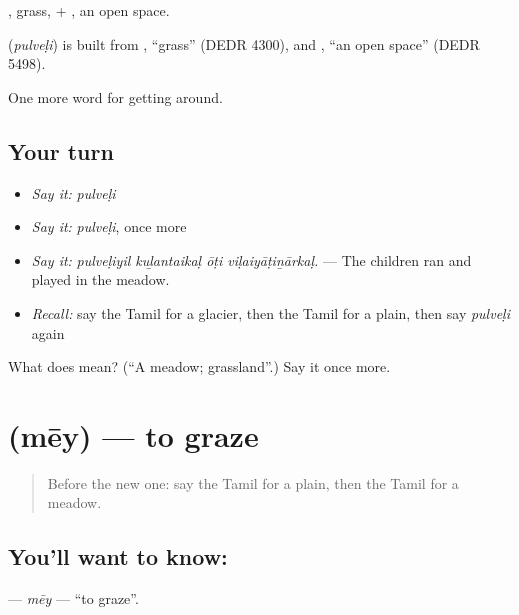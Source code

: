 , grass, + , an open space.

\begin{cousinweb}
\textbf{} (\emph{pulveḷi}) is built from , \textquotedblleft{}grass\textquotedblright{} (DEDR 4300), and , \textquotedblleft{}an open space\textquotedblright{} (DEDR 5498).
\end{cousinweb}

\begin{grammarlens}[title={What you've built}]
One more word for getting around.
\end{grammarlens}

\subsection*{Your turn}
\begin{itemize}
\raggedright
  \item \emph{Say it:} \emph{pulveḷi}
  \item \emph{Say it:} \emph{pulveḷi}, once more
  \item \emph{Say it:} \emph{pulveḷiyil kuḻantaikaḷ ōṭi viḷaiyāṭiṉārkaḷ.} — The children ran and played in the meadow.
  \item \emph{Recall:} say the Tamil for a glacier, then the Tamil for a plain, then say \emph{pulveḷi} again
\end{itemize}

\begin{tcolorbox}[breakable,colback=teal!4,colframe=teal!35!black,title={Before you move on}]
What does  mean? (\textquotedblleft{}A meadow; grassland\textquotedblright{}.) Say it once more.
\end{tcolorbox}
\section[\texorpdfstring{\ta{மேய்} (mēy)}{மேய் (mēy)}]{ (mēy) — to graze}

\label{lesson:TA-C434-mey}



\begin{quote}
Before the new one: say the Tamil for a plain, then the Tamil for a meadow.
\end{quote}

\subsection*{You'll want to know: }
\textbf{} — \emph{mēy} — \textquotedblleft{}to graze\textquotedblright{}.


